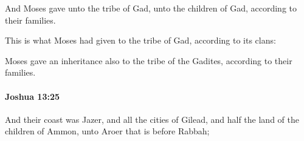 			\begin{versebox}
					\item[BHS] 
					\item[ASV] And Moses gave unto the tribe of Gad, unto the children of Gad, according to their families.
					\item[NIV] This is what Moses had given to the tribe of Gad, according to its clans:
					\item[NRSV] Moses gave an inheritance also to the tribe of the Gadites, according to their families.
			\end{versebox}

		\paragraph{Joshua 13:25} %
			\label{JOSHUA-13-25}

			And their coast was Jazer, and all the cities of Gilead, and half the land of the children of Ammon, unto Aroer that is before Rabbah;

